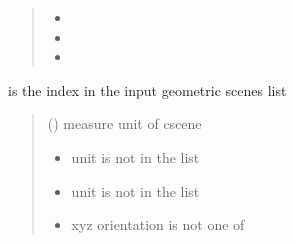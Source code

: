 \documentclass[letterpaper,10pt,english]{sphinxmanual}
\begin{document}
\begin{fulllineitems}
\begin{quote}
\begin{description}
\begin{itemize}
\begin{itemize}
\item {} 
\sphinxAtStartPar
{}

\item {} 
\sphinxAtStartPar
{}

\item {} 
\sphinxAtStartPar
{}

\end{itemize}


\end{itemize}

\end{description}\end{quote}

\sphinxAtStartPar
{} is the index in the input geometric scenes list
\begin{quote}\begin{description}
\sphinxAtStartPar
{} () \textendash{} measure unit of cscene

\begin{itemize}
\item {} 
\sphinxAtStartPar
{} \textendash{} unit is not in the list 

\item {} 
\sphinxAtStartPar
{} \textendash{} unit is not in the list 

\item {} 
\sphinxAtStartPar
{} \textendash{} xyz orientation is not one of 


\end{itemize}
\end{description}
\end{quote}
\end{fulllineitems}
\end{document}
